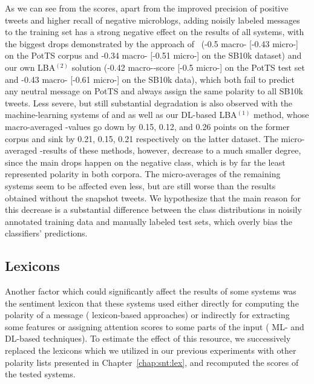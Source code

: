 As we can see from the scores, apart from the improved precision of
positive tweets and higher recall of negative microblogs, adding
noisily labeled messages to the training set has a strong negative
effect on the results of all systems, with the biggest drops
demonstrated by the approach of~\citeauthor{Baziotis:17} (-0.5
macro-\F{} [-0.43 micro-\F{}] on the PotTS corpus and -0.34 macro-\F{}
[-0.51 micro-\F{}] on the SB10k dataset) and our own LBA$^{(2)}$
solution (-0.42 macro-\F{}-score [-0.5 micro-\F{}] on the PotTS test
set and -0.43 macro-\F{} [-0.61 micro-\F{}] on the SB10k data), which
both fail to predict any neutral message on PotTS and always assign
the same polarity to all SB10k tweets.  Less severe, but still
substantial degradation is also observed with the machine-learning
systems of \citeauthor{Mohammad:09} and \citeauthor{Guenther:13} as
well as our DL-based LBA$^{(1)}$ method, whose macro-averaged
\F{}-values go down by 0.15, 0.12, and 0.26 points on the former
corpus and sink by 0.21, 0.15, 0.21 respectively on the latter
dataset.  The micro-averaged \F{}-results of these methods, however,
decrease to a much smaller degree, since the main drops happen on the
negative class, which is by far the least represented polarity in both
corpora.  The micro-averages of the remaining systems seem to be
affected even less, but are still worse than the results obtained
without the snapshot tweets.  We hypothesize that the main reason for
this decrease is a substantial difference between the class
distributions in noisily annotated training data and manually labeled
test sets, which overly bias the classifiers' predictions.


\subsection{Lexicons}\label{cgsa:subsec:eval:lexicons}

Another factor which could significantly affect the results of some
systems was the sentiment lexicon that these systems used either
directly for computing the polarity of a message (\eg{} lexicon-based
approaches) or indirectly for extracting some features or assigning
attention scores to some parts of the input (\eg{} ML- and DL-based
techniques).  To estimate the effect of this resource, we successively
replaced the lexicons which we utilized in our previous experiments
with other polarity lists presented in Chapter~\ref{chap:snt:lex}, and
recomputed the scores of the tested systems.

